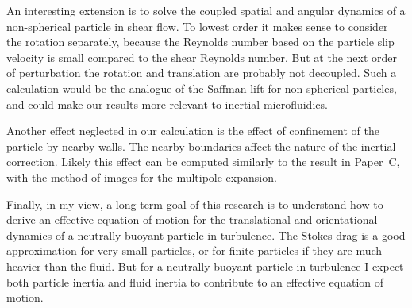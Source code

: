 \documentclass[thesis.tex]{subfiles}
\begin{document}
An interesting extension is to solve the coupled spatial and angular dynamics of a non-spherical particle in shear flow. To lowest order it makes sense to consider the rotation separately, because the Reynolds number based on the particle slip velocity is small compared to the shear Reynolds number. But at the next order of perturbation the rotation and translation are probably not decoupled. Such a calculation would be the analogue of the Saffman lift for non-spherical particles, and could make our results more relevant to inertial microfluidics.

Another effect neglected in our calculation is the effect of confinement of the particle by nearby walls. The nearby boundaries affect the nature of the inertial correction. Likely this effect can be computed similarly to the result in Paper~C, with the method of images for the multipole expansion.

Finally, in my view, a long-term goal of this research is to understand how to derive an effective equation of motion for the translational and orientational dynamics of a neutrally buoyant particle in turbulence. The Stokes drag is a good approximation for very small particles, or for finite particles if they are much heavier than the fluid. But for a neutrally buoyant particle in turbulence I expect both particle inertia and fluid inertia to contribute to an effective equation of motion.
\end{document}
